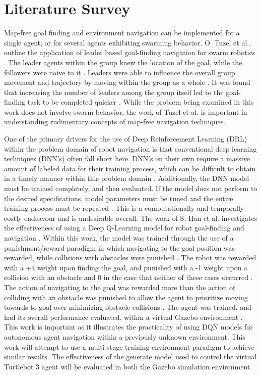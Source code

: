 \documentclass[conference]{IEEEtran}
\begin{document}
\section{Literature Survey}
Map-free goal finding and environment navigation can be implemented for a single agent, or for several agents exhibiting swarming behavior. O. Tuzel et al., outline the application of leader based goal-finding navigation for swarm robotics \cite{b1}. The leader agents within the group knew the location of the goal, while the followers were naive to it \cite{b2}. Leaders were able to influence the overall group movement and trajectory by moving within the group as a whole \cite{b2}. It was found that increasing the number of leaders among the group itself led to the goal-finding task to be completed quicker \cite{b2}. While the problem being examined in this work does not involve swarm behavior, the work of Tuzel et al. is important in understanding rudimentary concepts of map-free navigation techniques. 

One of the primary drivers for the use of Deep Reinforcement Learning (DRL) within the problem domain of robot navigation is that conventional deep learning techniques (DNN's) often fall short here. DNN's on their own require a massive amount of labeled data for their training process, which can be difficult to obtain in a timely manner within this problem domain \cite{b3}. Additionally, the DNN model must be trained completely, and then evaluated. If the model does not perform to the desired specifications, model parameters must be tuned and the entire training process must be repeated \cite{b3}. This is a computationally and temporally costly endeavour and is undesirable overall. The work of S. Han et al. investigates the effectiveness of using a Deep Q-Learning model for robot goal-finding and navigation \cite{b3}. Within this work, the model was trained through the use of a punishment/reward paradigm in which navigating to the goal position was rewarded, while collisions with obstacles were punished \cite{b3}. The robot was rewarded with a +4 weight upon finding the goal, and punished with a -1 weight upon a collision with an obstacle \cite{b3} and 0 in the case that neither of these cases occurred \cite{b3}. The action of navigating to the goal was rewarded more than the action of colliding with an obstacle was punished to allow the agent to prioritize moving towards to goal over minimizing obstacle collisions \cite{b3}. The agent was trained, and had its overall performance evaluated, within a virtual Gazebo environment \cite{b3}. This work is important as it illustrates the practicality of using DQN models for autonomous agent navigation within a previously unknown environment. This work will attempt to use a multi-stage training environment paradigm to achieve similar results. The effectiveness of the generate model used to control the virtual  Turtlebot 3 agent will be evaluated in both the Gazebo simulation environment. 
\end{document}
